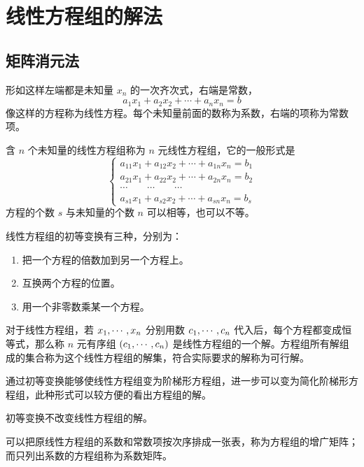 \chapter{线性方程组的解法}

\section{矩阵消元法}

形如这样左端都是未知量 $x_n$ 的一次齐次式，右端是常数，
\[a_1x_1+a_2x_2+\cdots+a_nx_n=b\]
像这样的方程称为线性方程。每个未知量前面的数称为系数，右端的项称为常数项。

含 $n$ 个未知量的线性方程组称为 $n$ 元线性方程组，它的一般形式是
\begin{equation*}
	\left\{
	\begin{matrix}
		a_{11}x_1+a_{12}x_2+\cdots+a_{1n}x_n=b_1 \\
		a_{21}x_1+a_{22}x_2+\cdots+a_{2n}x_n=b_2 \\
		\cdots\qquad\cdots\qquad\cdots           \\
		a_{s1}x_1+a_{s2}x_2+\cdots+a_{sn}x_n=b_s
	\end{matrix}
	\right.
\end{equation*}
方程的个数 $s$ 与未知量的个数 $n$ 可以相等，也可以不等。

\begin{definition}[线性方程组的初等变换]
	线性方程组的初等变换有三种，分别为：

	\begin{enumerate}
		\item 把一个方程的倍数加到另一个方程上。
		\item 互换两个方程的位置。
		\item 用一个非零数乘某一个方程。
	\end{enumerate}
\end{definition}

对于线性方程组，若 $x_1,\cdots,x_n$ 分别用数 $c_1,\cdots,c_n$ 代入后，每个方程都变成恒等式，那么称 $n$ 元有序组 $(c_1,\cdots,c_n)$ 是线性方程组的一个解。方程组所有解组成的集合称为这个线性方程组的解集，符合实际要求的解称为可行解。

通过初等变换能够使线性方程组变为阶梯形方程组，进一步可以变为简化阶梯形方程组，此种形式可以较方便的看出方程组的解。

\begin{theorem}
	初等变换不改变线性方程组的解。
\end{theorem}

可以把原线性方程组的系数和常数项按次序排成一张表，称为方程组的增广矩阵；而只列出系数的方程组称为系数矩阵。

